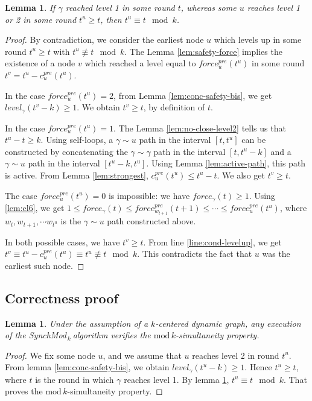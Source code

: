 \documentclass[11pt,letterpaper]{article}
\newtheorem{lem}[thm]{Lemma}
\newcommand{\cent}{\gamma}
\newcommand{\SM}{{\em SynchMod}$_{\,k}\ $}
\begin{document}
\begin{lem} \label{lem:later-level1}
	If $\cent$ reached level 1 in some round $t$, whereas some $u$ reaches level 1 or 2 in some round $t^u \geq t$, then $t^u \equiv t \mod k$. 
\end{lem}
\begin{proof}
	By contradiction, we consider the earliest node $u$ which levels up in some round $t^u \geq t$ with $t^u \not\equiv t \mod k$.
	The Lemma \ref{lem:safety-force} implies the existence of a node $v$ which reached a level equal to $force_u^{pre}(t^u)$ in some round $t^v = t^u-c_u^{pre}(t^u)$. 

	In the case $force_u^{pre}(t^u) = 2$, from Lemma \ref{lem:conc-safety-bis}, we get $level_\cent(t^v-k) \geq 1$. We obtain $t^v \geq t$, by definition of $t$.

	In the case $force_u^{pre}(t^u) = 1$.
	The Lemma \ref{lem:no-close-level2} tells us that $t^u-t \geq k$.
	Using self-loops, a $\cent \sim u$ path in the interval $[t,t^u]$ can be constructed by concatenating the $\cent \sim \cent$ path in the interval $[t,t^u-k]$
	and a $\cent \sim u$ path in the interval $[t^u-k,t^u]$.
	Using Lemma \ref{lem:active-path}, this path is active.
	From Lemma \ref{lem:strongest}, $c_u^{pre}(t^u) \leq t^u-t$.
	We also get $t^v \geq t$.

	The case $force_u^{pre}(t^u) = 0$ is impossible: we have $force_\cent(t) \geq 1$.
	Using \ref{lem:cl6}, we get $1 \leq force_\cent(t) \leq force_{w_{t+1}}^{pre}(t+1) \leq \cdots \leq force_u^{pre}(t^u)$,
	where $w_t, w_{t+1}, \cdots w_{t^u}$ is the $\cent \sim u$ path constructed above.

	In both possible cases, we have $t^v \geq t$.
	From line \ref{line:cond-levelup}, we get $t^v \equiv t^u-c_u^{pre}(t^u) \equiv t^u \not\equiv t \mod k$.
	This contradicts the fact that $u$ was the earliest such node.
\end{proof}

\subsection{Correctness proof}

\begin{lem} \label{lem:safety} 
	Under the assumption of a $k$-centered dynamic graph, 
	any execution of the \SM algorithm verifies the $\mathrm{mod}\,k$-simultaneity property.
\end{lem}
\begin{proof}
	We fix some node $u$, and we assume that $u$ reaches level 2 in round $t^u$.
	From lemma \ref{lem:conc-safety-bis}, we obtain $level_\cent(t^u-k) \geq 1$.
	Hence $t^u \geq t$, where $t$ is the round in which $\cent$ reaches level 1.
	By lemma \ref{lem:later-level1}, $t^u \equiv t \mod k$.
	That proves the $\mathrm{mod}\,k$-simultaneity property.
\end{proof}
\end{document}
